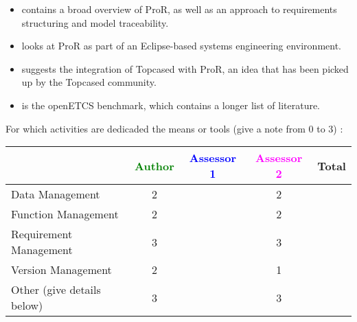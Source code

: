 \begin{itemize}

\item \cite{RMF_Mark_Book_Jastram_2013} contains a broad overview of ProR, as well as an approach to requirements structuring and model traceability.

\item \cite{jastram_forms_2012} looks at ProR as part of an Eclipse-based systems engineering environment.

\item \cite{topcase-JaGr2011} suggests the integration of Topcased with ProR, an idea that has been picked up by the Topcased community.

\item \cite{pror-benchmark} is the openETCS benchmark, which contains a longer list of literature.

\end{itemize}

For which activities are dedicaded the means or tools (give a note from 0 to  3) :

\begin{tabular}{|l | c | c | c | c|}
\hline
& \textcolor{green}{Author} & \textcolor{blue}{Assessor 1} & \textcolor{magenta}{Assessor 2} & Total \\
\hline
Data Management & 2 & & 2 &  \\
\hline
Function Management & 2 & & 2 & \\
\hline
Requirement Management & 3 & & 3 & \\
\hline
Version Management & 2 & & 1 & \\
\hline
Other (give details below) & 3 & & 3 & \\
\hline
\end{tabular}

